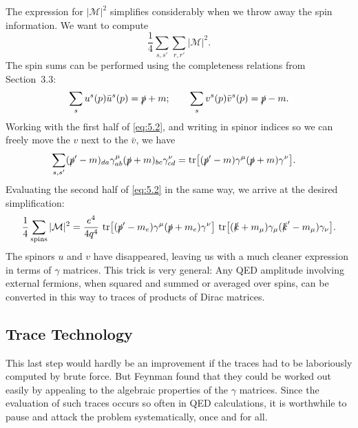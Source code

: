 The expression for $|\mathcal{M}|^2$ simplifies considerably when we throw
away the spin information.  We want to compute
\begin{equation}
  \frac{1}{4}\sum_{s,s'}\sum_{r,r'}|\mathcal{M}|^2 .
\end{equation}
The spin sums can be performed using the completeness relations from
Section~3.3:
\begin{equation}
  \sum_s u^s(p)\bar{u}^s(p) = \slashed{p} + m;\qquad
  \sum_s v^s(p)\bar{v}^s(p) = \slashed{p} - m .
  \label{eq:5.3}
\end{equation}
Working with the first half of \eqref{eq:5.2}, and writing in spinor indices
so we can freely move the $v$ next to the $\bar{v}$, we have
\begin{equation}
  \begin{aligned}
    \sum_{s,s'} (\slashed{p}' - m)_{da}\gamma^\mu_{ab}(\slashed{p} + m)_{bc}
      \gamma^\nu_{cd} &= \mathrm{tr}\bigl[
        (\slashed{p}' - m)\gamma^\mu(\slashed{p} + m)\gamma^\nu \bigr].
  \end{aligned}
\end{equation}
Evaluating the second half of \eqref{eq:5.2} in the same way, we arrive at
the desired simplification:
\begin{equation}
  \frac{1}{4}\sum_{\text{spins}}|\mathcal{M}|^2
    = \frac{e^4}{4q^4}\ \mathrm{tr}\bigl[
      (\slashed{p}' - m_e)\gamma^\mu(\slashed{p} + m_e)\gamma^\nu \bigr]\
      \mathrm{tr}\bigl[ (\slashed{k} + m_\mu)\gamma_\mu(\slashed{k}' - m_\mu)
        \gamma_\nu \bigr] .
  \label{eq:5.4}
\end{equation}
The spinors $u$ and $v$ have disappeared, leaving us with a much cleaner
expression in terms of $\gamma$ matrices.  This trick is very general: Any QED
amplitude involving external fermions, when squared and summed or averaged
over spins, can be converted in this way to traces of products of Dirac
matrices.

\subsection{Trace Technology}

This last step would hardly be an improvement if the traces had to be
laboriously computed by brute force.  But Feynman found that they could be
worked out easily by appealing to the algebraic properties of the $\gamma$
matrices.  Since the evaluation of such traces occurs so often in QED
calculations, it is worthwhile to pause and attack the problem
systematically, once and for all.

